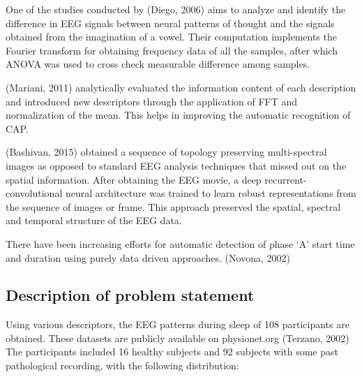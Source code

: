 \documentclass{article}
\begin{document}
One of the studies conducted by (Diego, 2006) aims to analyze and identify the difference in EEG signals between neural patterns of thought and the signals obtained from the imagination of a vowel. Their computation implements the Fourier transform for obtaining frequency data of all the samples, after which ANOVA was used to cross check measurable difference among samples. 

	(Mariani, 2011) analytically evaluated the information content of each description and introduced new descriptors through the application of FFT and normalization of the mean. This helps in improving the automatic recognition of CAP. 

	(Bashivan, 2015) obtained a sequence of topology preserving multi-spectral images as opposed to standard EEG analysis techniques that missed out on the spatial information. After obtaining the EEG movie, a deep recurrent-convolutional neural architecture was trained to learn robust representations from the sequence of images or frame. This approach preserved the spatial, spectral and temporal structure of the EEG data.

	There have been increasing efforts for automatic detection of phase ‘A’ start time and duration using purely data driven approaches. (Novona, 2002)



\subsection{Description of problem statement}

Using various descriptors, the EEG patterns during sleep of 108 participants are obtained. These datasets are publicly available on physionet.org (Terzano, 2002) The participants included 16 healthy subjects and 92 subjects with some past pathological recording, with the following distribution:
\end{document}
